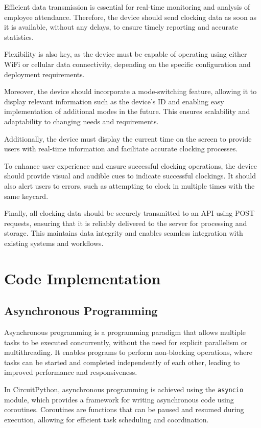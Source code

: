Efficient data transmission is essential for real-time monitoring and analysis of employee 
attendance. Therefore, the device should send clocking data as soon as it is available, without any 
delays, to ensure timely reporting and accurate statistics.

Flexibility is also key, as the device must be capable of operating using either WiFi or cellular 
data connectivity, depending on the specific configuration and deployment requirements.

Moreover, the device should incorporate a mode-switching feature, allowing it to display relevant 
information such as the device's ID and enabling easy implementation of additional modes in the 
future. This ensures scalability and adaptability to changing needs and requirements.

Additionally, the device must display the current time on the screen to provide users with 
real-time information and facilitate accurate clocking processes.

To enhance user experience and ensure successful clocking operations, the device should provide 
visual and audible cues to indicate successful clockings. It should also alert users to errors, 
such as attempting to clock in multiple times with the same keycard.

Finally, all clocking data should be securely transmitted to an API using POST requests, ensuring 
that it is reliably delivered to the server for processing and storage. This maintains data 
integrity and enables seamless integration with existing systems and workflows.


\section{Code Implementation}

\subsection{Asynchronous Programming}

Asynchronous programming is a programming paradigm that allows multiple tasks to be executed 
concurrently, without the need for explicit parallelism or multithreading. It enables programs to 
perform non-blocking operations, where tasks can be started and completed independently of each 
other, leading to improved performance and responsiveness.

In CircuitPython, asynchronous programming is achieved using the \texttt{asyncio} module, which 
provides a framework for writing asynchronous code using coroutines. Coroutines are functions 
that can be paused and resumed during execution, allowing for efficient task scheduling and 
coordination.

